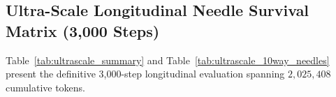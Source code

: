 \documentclass[11pt,letterpaper]{article}
\theoremstyle{definition}
\begin{document}
\subsection{Ultra-Scale Longitudinal Needle Survival Matrix (3,000 Steps)}
Table~\ref{tab:ultrascale_summary} and Table~\ref{tab:ultrascale_10way_needles} present the definitive 3,000-step longitudinal evaluation spanning $2,025,408$ cumulative tokens.

\begin{table}[h]
\centering
\small
{}
\caption{Ultra-scale referee stress test up to 3,000 steps ($2.02\text{M}$ tokens) on Apple Silicon Metal.}
\label{tab:ultrascale_summary}
\end{table}
\end{document}
